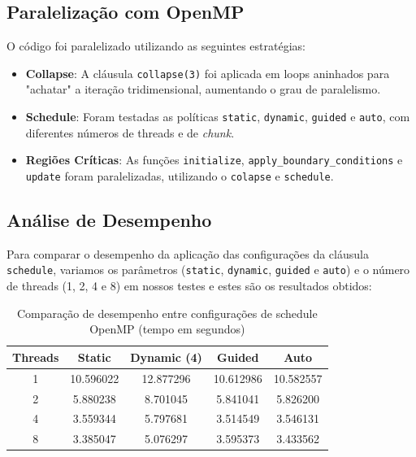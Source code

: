 \documentclass[a4paper, 12pt]{article}
\begin{document}
	\subsection{Paralelização com OpenMP}  
	O código foi paralelizado utilizando as seguintes estratégias:  
	\begin{itemize}  
		\item \textbf{Collapse}: A cláusula \texttt{collapse(3)} foi aplicada em loops aninhados para "achatar" a iteração tridimensional, aumentando o grau de paralelismo.  
		\item \textbf{Schedule}: Foram testadas as políticas \texttt{static}, \texttt{dynamic}, \texttt{guided} e \texttt{auto}, com diferentes números de threads e de \textit{chunk}.  
		\item \textbf{Regiões Críticas}: As funções \texttt{initialize}, \texttt{apply\_boundary\_conditions} e \texttt{update} foram paralelizadas, utilizando o \texttt{colapse} e \texttt{schedule}. 
	\end{itemize}  
	
	\subsection{Análise de Desempenho}  
	Para comparar o desempenho da aplicação das configurações da cláusula \texttt{schedule}, variamos os parâmetros (\texttt{static}, \texttt{dynamic}, \texttt{guided} e \texttt{auto}) e o número de threads (1, 2, 4 e 8) em nossos testes e estes são os resultados obtidos:
	
	\begin{table}[htbp]
		\centering
		\caption{Comparação de desempenho entre configurações de schedule OpenMP (tempo em segundos)}
		
		\vspace{1cm}
		\begin{tabular}{|c|c|c|c|c|}
			\hline
			\textbf{Threads} & \textbf{Static} & \textbf{Dynamic (4)} & \textbf{Guided} & \textbf{Auto} \\
			\hline
			1 & 10.596022 & 12.877296 & 10.612986 & 10.582557 \\
			\hline
			2 & 5.880238 & 8.701045 & 5.841041 & 5.826200 \\
			\hline
			4 & 3.559344 & 5.797681 & 3.514549 & 3.546131 \\
			\hline
			8 & 3.385047 & 5.076297 & 3.595373 & 3.433562 \\
			\hline
		\end{tabular}
		\label{tab:openmp_schedule_performance}
	\end{table}  
	
\end{document}
